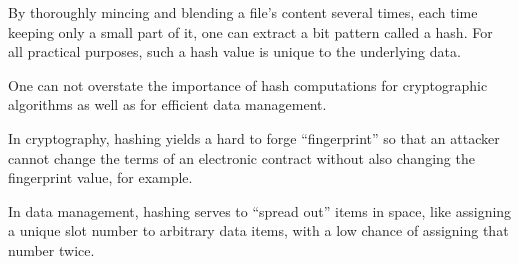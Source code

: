 
By thoroughly mincing and blending a file's content several times,
each time keeping only a small part of it, one can extract a bit
pattern called a hash. For all practical purposes, such a hash value
is unique to the underlying data.

One can not overstate the importance of hash computations for
cryptographic algorithms as well as for efficient data management.

In cryptography, hashing yields a hard to forge ``fingerprint'' so that
an attacker cannot change the terms of an electronic contract without
also changing the fingerprint value, for example.

In data management, hashing serves to ``spread out'' items in space,
like assigning a unique slot number to arbitrary data items,
with a low chance of assigning that number twice.

